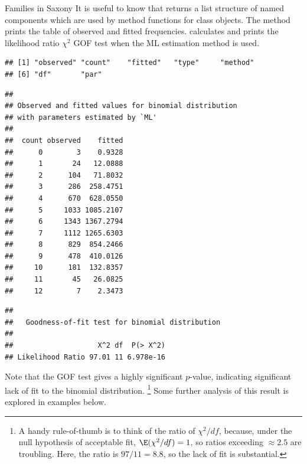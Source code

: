 \documentclass[11pt]{book}
\renewenvironment{knitrout}{\small\renewcommand{\baselinestretch}{.85}}{} %
\begin{document}
\begin{Example}[saxfit]{Families in Saxony}
It is useful to know that  returns a list structure of
named components which are used by method functions for class 
objects. The  method prints the table of
observed and fitted frequencies.  calculates and
prints the likelihood ratio $\chi^2$ GOF test when the ML estimation method is used.
\begin{knitrout}
\color{fgcolor}\begin{kframe}
\begin{alltt}
     
\end{alltt}
\begin{verbatim}
## [1] "observed" "count"    "fitted"   "type"     "method"  
## [6] "df"       "par"
\end{verbatim}
\begin{alltt}
            
\end{alltt}
\begin{verbatim}
## 
## Observed and fitted values for binomial distribution
## with parameters estimated by `ML' 
## 
##  count observed    fitted
##      0        3    0.9328
##      1       24   12.0888
##      2      104   71.8032
##      3      286  258.4751
##      4      670  628.0550
##      5     1033 1085.2107
##      6     1343 1367.2794
##      7     1112 1265.6303
##      8      829  854.2466
##      9      478  410.0126
##     10      181  132.8357
##     11       45   26.0825
##     12        7    2.3473
\end{verbatim}
\begin{alltt}
   
\end{alltt}
\begin{verbatim}
## 
## 	 Goodness-of-fit test for binomial distribution
## 
##                    X^2 df  P(> X^2)
## Likelihood Ratio 97.01 11 6.978e-16
\end{verbatim}
\end{kframe}
\end{knitrout}
Note that the GOF test gives a highly significant $p$-value, indicating 
significant lack of fit to the binomial distribution.%
\footnote{
A handy rule-of-thumb is to think of the ratio of $\chi^2 / df$,
because, under the null hypothesis of acceptable fit, $\E (\chi^2 / df) = 1$,
so ratios exceeding $\approx 2.5$ are troubling.
Here, the ratio is $97 / 11 = 8.8$, so the lack of fit is substantial.
}
Some further analysis of this result is explored in examples below.
\end{Example}
\end{document}
